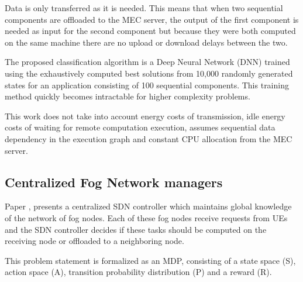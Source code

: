 Data is only transferred as it is needed. This means that when two sequential components are offloaded to the \acrshort{MEC} server, the output of the first component is needed as input for the second component but because they were both computed on the same machine there are no upload or download delays between the two.

The proposed classification algorithm is a Deep Neural Network (DNN) trained using the exhaustively computed best solutions from 10,000 randomly generated states for an application consisting of 100 sequential components. This training method quickly becomes intractable for higher complexity problems.

This work does not take into account energy costs of transmission, idle energy costs of waiting for remote computation execution, assumes sequential data dependency in the execution graph and constant \acrshort{CPU} allocation from the \acrshort{MEC} server. 

\subsection{Centralized Fog Network managers}
\noindent Paper \cite{centralfog}, presents a centralized \acrfull{SDN} controller which maintains global knowledge of the network of fog nodes. Each of these fog nodes receive requests from \acrshort{UE}s and the \acrshort{SDN} controller decides if these tasks should be computed on the receiving node or offloaded to a neighboring node.

This problem statement is formalized as an \acrshort{MDP}, consisting of a state space (S), action space (A), transition probability distribution (P) and a reward (R).

